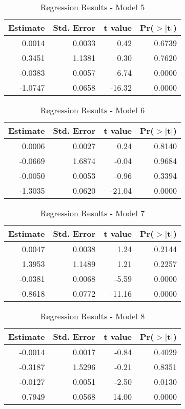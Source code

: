 \begin{table}[ht]
\centering
\begin{tabular}{rrrr}
  \hline
Estimate & Std. Error & t value & Pr($>$$|$t$|$) \\ 
  \hline
0.0014 & 0.0033 & 0.42 & 0.6739 \\ 
  0.3451 & 1.1381 & 0.30 & 0.7620 \\ 
  -0.0383 & 0.0057 & -6.74 & 0.0000 \\ 
  -1.0747 & 0.0658 & -16.32 & 0.0000 \\ 
   \hline
\end{tabular}
\caption{Regression Results - Model 5} 
\end{table}
\begin{table}[ht]
\centering
\begin{tabular}{rrrr}
  \hline
Estimate & Std. Error & t value & Pr($>$$|$t$|$) \\ 
  \hline
0.0006 & 0.0027 & 0.24 & 0.8140 \\ 
  -0.0669 & 1.6874 & -0.04 & 0.9684 \\ 
  -0.0050 & 0.0053 & -0.96 & 0.3394 \\ 
  -1.3035 & 0.0620 & -21.04 & 0.0000 \\ 
   \hline
\end{tabular}
\caption{Regression Results - Model 6} 
\end{table}
\begin{table}[ht]
\centering
\begin{tabular}{rrrr}
  \hline
Estimate & Std. Error & t value & Pr($>$$|$t$|$) \\ 
  \hline
0.0047 & 0.0038 & 1.24 & 0.2144 \\ 
  1.3953 & 1.1489 & 1.21 & 0.2257 \\ 
  -0.0381 & 0.0068 & -5.59 & 0.0000 \\ 
  -0.8618 & 0.0772 & -11.16 & 0.0000 \\ 
   \hline
\end{tabular}
\caption{Regression Results - Model 7} 
\end{table}
\begin{table}[ht]
\centering
\begin{tabular}{rrrr}
  \hline
Estimate & Std. Error & t value & Pr($>$$|$t$|$) \\ 
  \hline
-0.0014 & 0.0017 & -0.84 & 0.4029 \\ 
  -0.3187 & 1.5296 & -0.21 & 0.8351 \\ 
  -0.0127 & 0.0051 & -2.50 & 0.0130 \\ 
  -0.7949 & 0.0568 & -14.00 & 0.0000 \\ 
   \hline
\end{tabular}
\caption{Regression Results - Model 8} 
\end{table}

